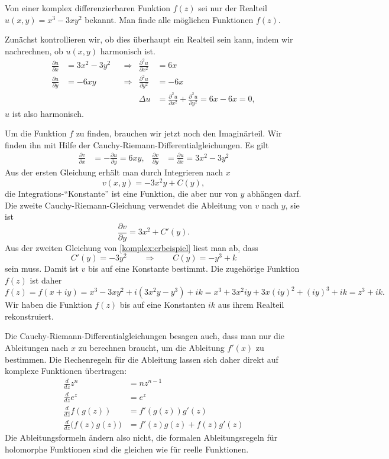\begin{beispiel}
Von einer komplex differenzierbaren Funktion $f(z)$ sei nur der Realteil
$u(x,y)=x^3 -3xy^2$ bekannt.
Man finde alle möglichen Funktionen $f(z)$.

Zunächst kontrollieren wir, ob dies überhaupt ein Realteil sein kann,
indem wir nachrechnen, ob $u(x,y)$ harmonisch ist.
\begin{equation*}
\begin{aligned}
\frac{\partial u}{\partial x}
&=
3x^2-3y^2
&&\Rightarrow&
\frac{\partial^2 u}{\partial x^2}
&=
6x
\\
\frac{\partial u}{\partial y}
&=
-6xy
&&\Rightarrow&
\frac{\partial^2 u}{\partial y^2}
&=
-6x
\\
&&&&\Delta u&=\frac{\partial^2u}{\partial x^2}+\frac{\partial^2u}{\partial y^2}=6x-6x=0,
\end{aligned}
\end{equation*}
$u$ ist also harmonisch.

Um die Funktion $f$ zu finden, brauchen wir jetzt noch den Imaginärteil.
Wir finden ihn mit Hilfe der Cauchy-Riemann-Differentialgleichungen.
Es gilt
\begin{equation}
\begin{aligned}
\frac{\partial v}{\partial x}
&=
-\frac{\partial u}{\partial y}=6xy,
&
\frac{\partial v}{\partial y}
&=
\frac{\partial u}{\partial x}=3x^2-3y^2
\end{aligned}
\label{komplex:crbeispiel}
\end{equation}
Aus der ersten Gleichung erhält man durch Integrieren nach $x$
\[
v(x,y)=-3x^2y + C(y),
\]
die Integrations-``Konstante'' ist eine Funktion, die aber nur von $y$
abhängen darf.
Die zweite Cauchy-Riemann-Gleichung verwendet die Ableitung von $v$ nach $y$,
sie ist
\[
\frac{\partial v}{\partial y}=3x^2+C'(y).
\]
Aus der zweiten Gleichung von \eqref{komplex:crbeispiel} liest man
ab, dass
\[
C'(y)=-3y^2
\qquad\Rightarrow\qquad
C(y)=-y^3+k
\]
sein muss.
Damit ist $v$ bis auf eine Konstante bestimmt.
Die zugehörige Funktion $f(z)$ ist daher
\[
f(z)=f(x+iy)=x^3-3xy^2+i(3x^2y-y^3)+ik
=x^3 + 3x^2iy + 3x(iy)^2+(iy)^3+ik=z^3+ik.
\]
Wir haben die Funktion $f(z)$ bis auf eine Konstanten $ik$
aus ihrem Realteil rekonstruiert.
\end{beispiel}
Die Cauchy-Riemann-Differentialgleichungen besagen auch, dass man nur
die Ableitungen nach $x$ zu berechnen braucht, um die Ableitung $f'(x)$
zu bestimmen.
Die Rechenregeln für die Ableitung lassen sich daher direkt auf
komplexe Funktionen übertragen:
\begin{align*}
\frac{d}{dz}z^n
&=
nz^{n-1}
\\
\frac{d}{dz}e^z
&=
e^z
\\
\frac{d}{dz}f(g(z))
&=
f'(g(z)) g'(z)
\\
\frac{d}{dz}\bigl(f(z)g(z)\bigr)
&=
f'(z)g(z)+f(z)g'(z)
\end{align*}
Die Ableitungsformeln ändern also nicht, die formalen Ableitungsregeln
für holomorphe Funktionen sind die gleichen wie für reelle Funktionen.




